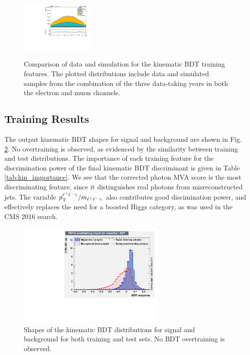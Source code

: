 \begin{figure}[tb]
\begin{center}
		\includegraphics[width=0.32\textwidth]{fig/MVA/sc_all_kin_lepeta1_valid_ptwei_cat0.pdf}\\
		\end{center}
	\caption{Comparison of data and simulation for the kinematic BDT training features. The plotted distributions include data and simulated samples from the combination of the three 
	data-taking years in both the electron and muon channels.}
	\label{fig:kin_vars1}
\end{figure}

\subsection{Training Results}
The output kinematic BDT shapes for signal and background are shown in Fig. \ref{fig:kin_overtrain}. No overtraining is observed, 
as evidenced by the similarity between training and test distributions. The importance of each training feature for the discrimination power of
the final kinematic BDT discriminant is given in Table \ref{tab:kin_importance}. We see that the corrected photon MVA score is the most discriminating 
feature, since it distinguishes real photons from misreconstructed jets. The variable $p_{\mathrm{T}}^{\ell^{+}\ell^{-}\gamma}/m_{\ell^{+}\ell^{-}\gamma}$ also contributes good discimination power, and 
effectively replaces the need for a boosted Higgs category, as was used in the CMS 2016 search. 

\begin{figure}[tb]
	\begin{center}
		\includegraphics[width=0.65\textwidth]{fig/MVA/kin_overtrain_BDT.pdf}
	\end{center}
	\caption{Shapes of the kinematic BDT distributions for signal and background for both training and test sets. No BDT overtraining is observed.}\label{fig:kin_overtrain}
\end{figure}

